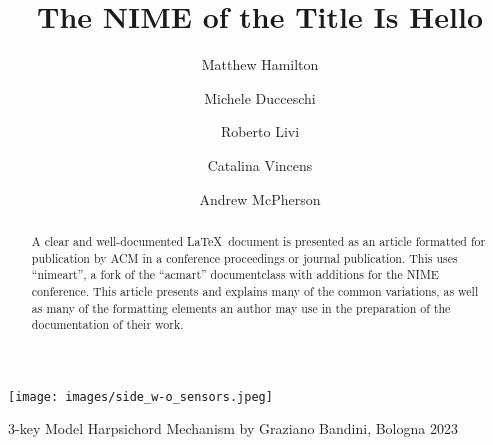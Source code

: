 \documentclass[sigconf]{nimeart}
\begin{document}
\title{The NIME of the Title Is Hello}

\author{Matthew Hamilton}
\author{Michele Ducceschi}

\author{Roberto Livi}
\author{Catalina Vincens}

\author{Andrew McPherson}

\renewcommand{\shortauthors}{Trovato et al.}

\begin{abstract}
  A clear and well-documented \LaTeX\ document is presented as an
  article formatted for publication by ACM in a conference proceedings
  or journal publication. This uses ``nimeart'', a fork of the ``acmart''
  documentclass with additions for the NIME conference. This
  article presents and explains many of the common variations, as well
  as many of the formatting elements an author may use in the
  preparation of the documentation of their work.
\end{abstract}

\begin{teaserfigure}
  \texttt{[image: images/side\_w-o\_sensors.jpeg]}
  \caption{3-key Model Harpsichord Mechanism by Graziano Bandini, Bologna 2023}
  \label{fig:teaser}
\end{teaserfigure}
\end{document}
